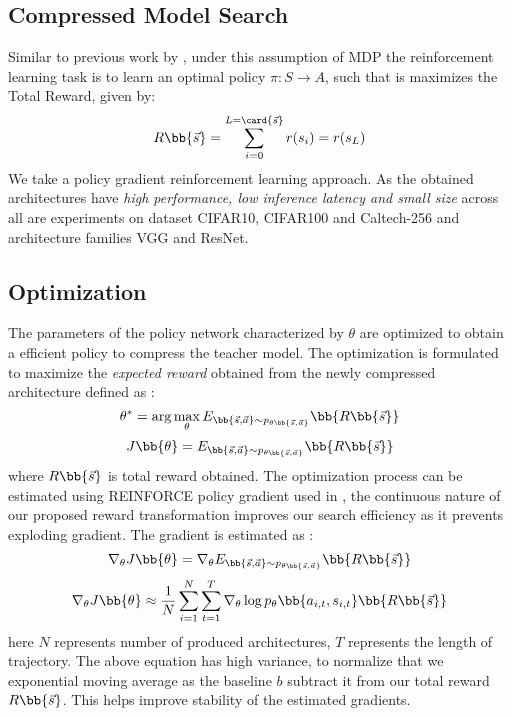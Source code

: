 \documentclass[../main]{subfiles}
\begin{document}
\subsection{Compressed Model Search }
Similar to previous work by \cite{ashok2017n2n}, under this assumption of MDP the reinforcement learning task is to learn an optimal policy $\pi : S \rightarrow A $, such that is maximizes the Total Reward, given by:
\begin{equation}
    R\bb{\Vec{s}} = \sum_{i=0}^{L=\card{\Vec{s}}} r(s_{i}) = r(s_{L})
\end{equation}
We take a policy gradient reinforcement learning approach.
As the obtained architectures have \textit{high performance, low inference latency and small size} across all are experiments on dataset CIFAR10, CIFAR100 and Caltech-256 and architecture families VGG and ResNet.


\subsection{Optimization}

The parameters of the policy network characterized by $\theta$ are optimized to obtain a efficient policy to compress the teacher model.
The optimization is formulated to maximize the \textit{expected reward} obtained from the newly compressed architecture defined as :
\begin{equation}
    \theta^{*} = \arg \max_{\theta} E_{\bb{\Vec{s}, \Vec{a}} \sim p_{\theta\bb{\Vec{s}, \Vec{a}}}} \bb{R\bb{\Vec{s}}}
\end{equation}
\begin{equation} 
    J \bb{\theta} = E_{\bb{\Vec{s}, \Vec{a}} \sim p_{\theta\bb{\Vec{s}, \Vec{a}}}} \bb{R\bb{\Vec{s}}}
\end{equation}
where $R\bb{\Vec{s}}$ is total reward obtained.
The optimization process can be estimated using REINFORCE policy gradient used in \citep{williams1992simple}, the continuous nature of our proposed reward transformation improves our search efficiency as it prevents exploding gradient.
The gradient is estimated as :
\begin{equation}
    \nabla_{\theta}  J \bb{\theta} = \nabla_{\theta} E_{\bb{\Vec{s}, \Vec{a}} \sim p_{\theta\bb{\Vec{s}, \Vec{a}}}} \bb{R\bb{\Vec{s}}}
\end{equation}
\begin{equation}
     \nabla_{\theta}  J \bb{\theta} \approx \frac{1}{N} \sum_{i = 1}^{N} \sum_{t = 1}^{T} \nabla_{\theta} \log{p_{\theta}\bb{a_{i,t}, s_{i,t}}} \bb{R\bb{\Vec{s}}}
\end{equation}
here $N$ represents number of produced architectures, $T$ represents the length of trajectory.
The above equation has high variance, to normalize that we exponential moving average as the baseline $b$ subtract it from our total reward $R\bb{\Vec{s}}$.
This helps improve stability of the estimated gradients.
\end{document}
